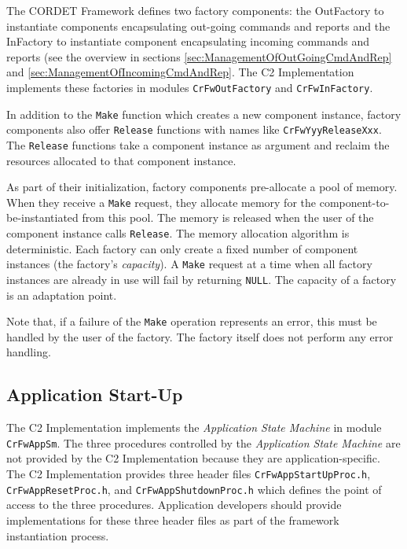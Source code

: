 \documentclass[a4paper,10pt]{article}
\begin{document}
The CORDET Framework defines two factory components: the OutFactory to instantiate components encapsulating out-going commands and reports and the InFactory to instantiate component encapsulating incoming commands and reports (see the overview in sections \ref{sec:ManagementOfOutGoingCmdAndRep} and \ref{sec:ManagementOfIncomingCmdAndRep}. The C2 Implementation implements these factories in modules \texttt{CrFwOutFactory} and \texttt{CrFwInFactory}. 

In addition to the \texttt{Make} function which creates a new component instance, factory components also offer \texttt{Release} functions with names like \texttt{CrFwYyyReleaseXxx}. The \texttt{Release} functions take a component instance as argument and reclaim the resources allocated to that component instance.

As part of their initialization, factory components pre-allocate a pool of memory. When they receive a \texttt{Make} request, they allocate memory for the component-to-be-instantiated from this pool. The memory is released when the user of the component instance calls \texttt{Release}. The memory allocation algorithm is deterministic. Each factory can only create a fixed number of component instances (the factory's \textit{capacity}). A \texttt{Make} request at a time when all factory instances are already in use will fail by returning \texttt{NULL}. The capacity of a factory is an adaptation point.

Note that, if a failure of the \texttt{Make} operation represents an error, this must be handled by the user of the factory. The factory itself does not perform any error handling.

\subsection{Application Start-Up}\label{sec:AppStartUp}


The C2 Implementation implements the \textit{Application State Machine} in module \texttt{CrFwAppSm}. The three procedures controlled by the \textit{Application State Machine} are not provided by the C2 Implementation because they are application-specific. The C2 Implementation provides three header files \texttt{CrFwAppStartUpProc.h}, \texttt{CrFwAppResetProc.h}, and \texttt{CrFwAppShutdownProc.h} which defines the point of access to the three procedures. Application developers should provide implementations for these three header files as part of the framework instantiation process.
\end{document}
